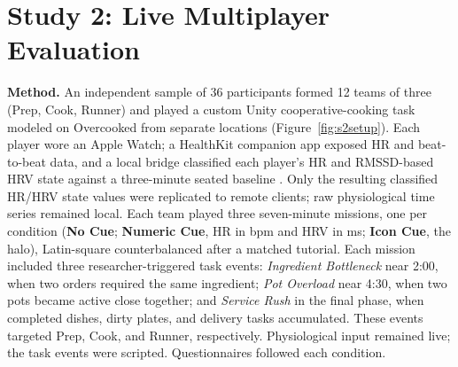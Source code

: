 \documentclass[sigconf]{acmart}
\begin{document}
\section{Study 2: Live Multiplayer Evaluation}
\textbf{Method.} An independent sample of 36 participants formed 12 teams of three (Prep, Cook, Runner) and played a custom Unity cooperative-cooking task modeled on Overcooked \cite{carroll_utility_2019} from separate locations (Figure~\ref{fig:s2setup}). Each player wore an Apple Watch; a HealthKit companion app exposed HR and beat-to-beat data, and a local bridge classified each player's HR and RMSSD-based HRV state against a three-minute seated baseline \cite{lopes_architecture_2023}. Only the resulting classified HR/HRV state values were replicated to remote clients; raw physiological time series remained local. Each team played three seven-minute missions, one per condition (\textbf{No Cue}; \textbf{Numeric Cue}, HR in bpm and HRV in ms; \textbf{Icon Cue}, the halo), Latin-square counterbalanced after a matched tutorial. Each mission included three researcher-triggered task events: \emph{Ingredient Bottleneck} near 2:00, when two orders required the same ingredient; \emph{Pot Overload} near 4:30, when two pots became active close together; and \emph{Service Rush} in the final phase, when completed dishes, dirty plates, and delivery tasks accumulated. These events targeted Prep, Cook, and Runner, respectively. Physiological input remained live; the task events were scripted. Questionnaires followed each condition.
\end{document}
